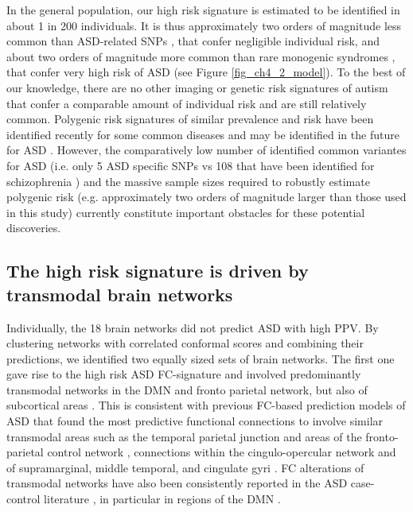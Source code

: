 \documentclass[9pt,lineno]{elife}
\begin{document}
In the general population, our high risk signature is estimated to be identified in about 1 in 200 individuals. It is thus approximately two orders of magnitude less common than ASD-related SNPs \citep{Grove2019-vz}, that confer negligible individual risk, and about two orders of magnitude more common than rare monogenic syndromes \citep{De_la_Torre-Ubieta2016-fw}, that confer very high risk of ASD (see Figure \ref{fig_ch4_2_model}). To the best of our knowledge, there are no other imaging or genetic risk signatures of autism that confer a comparable amount of individual risk and are still relatively common. Polygenic risk signatures of similar prevalence and risk have been identified recently for some common diseases \citep{Khera2018-of} and may be identified in the future for ASD \citep{Martin2018-id}. However, the comparatively low number of identified common variantes for ASD (i.e. only 5 ASD specific SNPs \citep{Grove2019-vz} vs 108 that have been identified for schizophrenia \citep{Schizophrenia_Working_Group_of_the_Psychiatric_Genomics_Consortium2014-ld}) and the massive sample sizes required to robustly estimate polygenic risk (e.g. approximately two orders of magnitude larger than those used in this study) currently constitute important obstacles for these potential discoveries. 

\subsection{The high risk signature is driven by transmodal brain networks}
Individually, the 18 brain networks did not predict ASD with high PPV. By clustering networks with correlated conformal scores and combining their predictions, we identified two equally sized sets of brain networks. The first one gave rise to the high risk ASD FC-signature and involved predominantly transmodal networks in the DMN and fronto parietal network, but also of subcortical areas \citep{Alves2019-ks}. This is consistent with previous FC-based prediction models of ASD that found the most predictive functional connections to involve similar transmodal areas such as the temporal parietal junction and areas of the fronto-parietal control network \citep{Abraham2017-vf}, connections within the cingulo-opercular network \citep{Yahata2016-jk} and of supramarginal, middle temporal, and cingulate gyri \citep{Heinsfeld2018-yl}. FC alterations of transmodal networks have also been consistently reported in the ASD case-control literature \citep{Monk2009-go,Holiga2019-ub,Just2007-ho}, in particular in regions of the DMN \citep{Washington2014-nx,Assaf2010-jx}.
\end{document}
